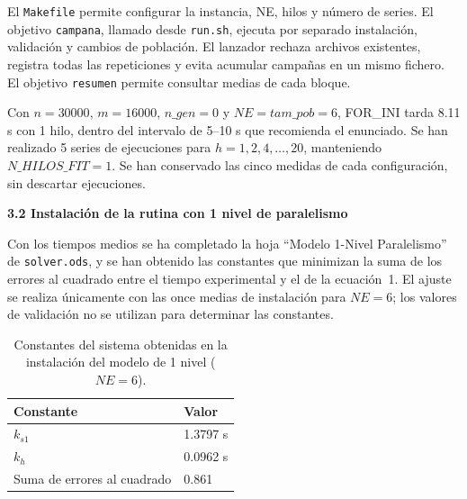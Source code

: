\documentclass[12pt]{article}
\begin{document}
\begin{enumerate}
\vspace{0.5cm}

El \texttt{Makefile} permite configurar la instancia, NE, hilos y número de series. El objetivo \texttt{campana}, llamado desde \texttt{run.sh}, ejecuta por separado instalación, validación y cambios de población. El lanzador rechaza archivos existentes, registra todas las repeticiones y evita acumular campañas en un mismo fichero. El objetivo \texttt{resumen} permite consultar medias de cada bloque.

Con $n = 30000$, $m = 16000$, $n\_gen = 0$ y $NE = tam\_pob = 6$, FOR\_INI tarda 8.11 s con 1 hilo, dentro del intervalo de 5--10 s que recomienda el enunciado. Se han realizado 5 series de ejecuciones para $h = 1, 2, 4, \dots, 20$, manteniendo $N\_HILOS\_FIT = 1$. Se han conservado las cinco medidas de cada configuración, sin descartar ejecuciones.

\medskip
\noindent\textbf{3.2 Instalación de la rutina con 1 nivel de paralelismo}\par
\smallskip

Con los tiempos medios se ha completado la hoja ``Modelo 1-Nivel Paralelismo'' de \texttt{solver.ods}, y se han obtenido las constantes que minimizan la suma de los errores al cuadrado entre el tiempo experimental y el de la ecuación~1. El ajuste se realiza únicamente con las once medias de instalación para $NE = 6$; los valores de validación no se utilizan para determinar las constantes.

\begin{table}[htbp]
\centering
\begin{tabular}{ll}
\toprule
\textbf{Constante} & \textbf{Valor} \\
\midrule
$k_{s1}$ & 1.3797 s \\
$k_h$ & 0.0962 s \\
Suma de errores al cuadrado & 0.861 \\
\bottomrule
\end{tabular}
\caption{Constantes del sistema obtenidas en la instalación del modelo de 1 nivel ($NE = 6$).}
\label{tab:c3_constantes}
\end{table}


\end{enumerate}
\end{document}
